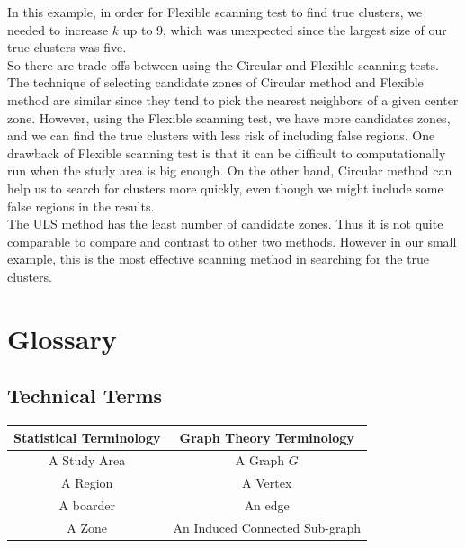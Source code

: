 \documentclass[12pt]{article}
\begin{document}
In this example, in order for Flexible scanning test to find true clusters, we needed to increase $k$ up to 9, which was unexpected since the largest size of our true clusters was five. \\

So there are trade offs between using the Circular and Flexible scanning tests. The technique of selecting candidate zones of Circular method and Flexible method are similar since they tend to pick the nearest neighbors of a given center zone. However, using the Flexible scanning test, we have more candidates zones, and we can find the true clusters with less risk of including false regions. One drawback of Flexible scanning test is that it can be difficult to computationally run when the study area is big enough. On the other hand, Circular method can help us to search for clusters more quickly, even though we might include some false regions in the results. \\
   
The ULS method has the least number of candidate zones. Thus it is not quite comparable to compare and contrast to other two methods. However in our small example, this is the most effective scanning method in searching for the true clusters. \\



\section{Glossary}
\subsection{Technical Terms}
\begin{tabular}{|c|c|}
\hline
\textbf{Statistical Terminology }& \textbf{Graph Theory Terminology} \\
\hline
A Study Area & A Graph $G$ \\
A Region & A Vertex \\
A boarder & An edge \\
A Zone & An Induced Connected Sub-graph\\

\hline

\end{tabular} \\

 	
\end{document}
